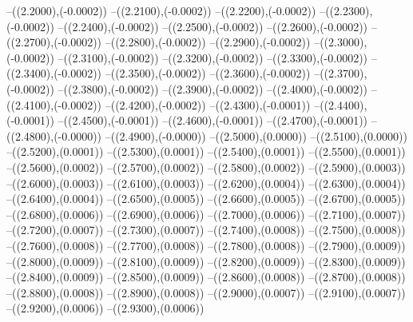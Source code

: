 {	--({\sx*(2.2000)},{\sy*(-0.0002)})
	--({\sx*(2.2100)},{\sy*(-0.0002)})
	--({\sx*(2.2200)},{\sy*(-0.0002)})
	--({\sx*(2.2300)},{\sy*(-0.0002)})
	--({\sx*(2.2400)},{\sy*(-0.0002)})
	--({\sx*(2.2500)},{\sy*(-0.0002)})
	--({\sx*(2.2600)},{\sy*(-0.0002)})
	--({\sx*(2.2700)},{\sy*(-0.0002)})
	--({\sx*(2.2800)},{\sy*(-0.0002)})
	--({\sx*(2.2900)},{\sy*(-0.0002)})
	--({\sx*(2.3000)},{\sy*(-0.0002)})
	--({\sx*(2.3100)},{\sy*(-0.0002)})
	--({\sx*(2.3200)},{\sy*(-0.0002)})
	--({\sx*(2.3300)},{\sy*(-0.0002)})
	--({\sx*(2.3400)},{\sy*(-0.0002)})
	--({\sx*(2.3500)},{\sy*(-0.0002)})
	--({\sx*(2.3600)},{\sy*(-0.0002)})
	--({\sx*(2.3700)},{\sy*(-0.0002)})
	--({\sx*(2.3800)},{\sy*(-0.0002)})
	--({\sx*(2.3900)},{\sy*(-0.0002)})
	--({\sx*(2.4000)},{\sy*(-0.0002)})
	--({\sx*(2.4100)},{\sy*(-0.0002)})
	--({\sx*(2.4200)},{\sy*(-0.0002)})
	--({\sx*(2.4300)},{\sy*(-0.0001)})
	--({\sx*(2.4400)},{\sy*(-0.0001)})
	--({\sx*(2.4500)},{\sy*(-0.0001)})
	--({\sx*(2.4600)},{\sy*(-0.0001)})
	--({\sx*(2.4700)},{\sy*(-0.0001)})
	--({\sx*(2.4800)},{\sy*(-0.0000)})
	--({\sx*(2.4900)},{\sy*(-0.0000)})
	--({\sx*(2.5000)},{\sy*(0.0000)})
	--({\sx*(2.5100)},{\sy*(0.0000)})
	--({\sx*(2.5200)},{\sy*(0.0001)})
	--({\sx*(2.5300)},{\sy*(0.0001)})
	--({\sx*(2.5400)},{\sy*(0.0001)})
	--({\sx*(2.5500)},{\sy*(0.0001)})
	--({\sx*(2.5600)},{\sy*(0.0002)})
	--({\sx*(2.5700)},{\sy*(0.0002)})
	--({\sx*(2.5800)},{\sy*(0.0002)})
	--({\sx*(2.5900)},{\sy*(0.0003)})
	--({\sx*(2.6000)},{\sy*(0.0003)})
	--({\sx*(2.6100)},{\sy*(0.0003)})
	--({\sx*(2.6200)},{\sy*(0.0004)})
	--({\sx*(2.6300)},{\sy*(0.0004)})
	--({\sx*(2.6400)},{\sy*(0.0004)})
	--({\sx*(2.6500)},{\sy*(0.0005)})
	--({\sx*(2.6600)},{\sy*(0.0005)})
	--({\sx*(2.6700)},{\sy*(0.0005)})
	--({\sx*(2.6800)},{\sy*(0.0006)})
	--({\sx*(2.6900)},{\sy*(0.0006)})
	--({\sx*(2.7000)},{\sy*(0.0006)})
	--({\sx*(2.7100)},{\sy*(0.0007)})
	--({\sx*(2.7200)},{\sy*(0.0007)})
	--({\sx*(2.7300)},{\sy*(0.0007)})
	--({\sx*(2.7400)},{\sy*(0.0008)})
	--({\sx*(2.7500)},{\sy*(0.0008)})
	--({\sx*(2.7600)},{\sy*(0.0008)})
	--({\sx*(2.7700)},{\sy*(0.0008)})
	--({\sx*(2.7800)},{\sy*(0.0008)})
	--({\sx*(2.7900)},{\sy*(0.0009)})
	--({\sx*(2.8000)},{\sy*(0.0009)})
	--({\sx*(2.8100)},{\sy*(0.0009)})
	--({\sx*(2.8200)},{\sy*(0.0009)})
	--({\sx*(2.8300)},{\sy*(0.0009)})
	--({\sx*(2.8400)},{\sy*(0.0009)})
	--({\sx*(2.8500)},{\sy*(0.0009)})
	--({\sx*(2.8600)},{\sy*(0.0008)})
	--({\sx*(2.8700)},{\sy*(0.0008)})
	--({\sx*(2.8800)},{\sy*(0.0008)})
	--({\sx*(2.8900)},{\sy*(0.0008)})
	--({\sx*(2.9000)},{\sy*(0.0007)})
	--({\sx*(2.9100)},{\sy*(0.0007)})
	--({\sx*(2.9200)},{\sy*(0.0006)})
	--({\sx*(2.9300)},{\sy*(0.0006)})
}
